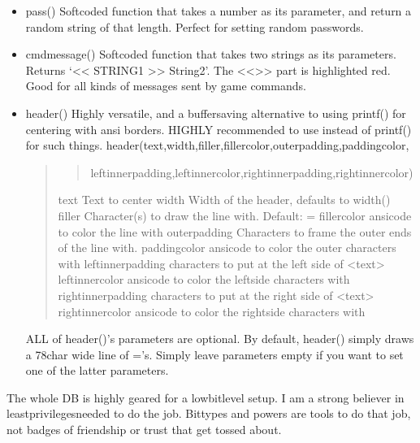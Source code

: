 \documentclass[letterpaper,10pt,english]{sphinxmanual}
\begin{document}
\begin{itemize}
\item {} 
\sphinxAtStartPar
pass() \sphinxhyphen{} Softcoded function that takes a number as its parameter, and return
a random string of that length. Perfect for setting random passwords.

\item {} 
\sphinxAtStartPar
cmdmessage() \sphinxhyphen{} Softcoded function that takes two strings as its parameters.
Returns ‘\textless{}\textless{} STRING1 \textgreater{}\textgreater{} String2’. The \textless{}\textless{}\textgreater{}\textgreater{} part is highlighted red. Good for
all kinds of messages sent by game commands.

\item {} 
\sphinxAtStartPar
header() \sphinxhyphen{} Highly versatile, and a buffer\sphinxhyphen{}saving alternative
to using printf() for centering with ansi borders. HIGHLY recommended to use
instead of printf() for such things.
header(text,width,filler,fillercolor,outerpadding,paddingcolor,
\begin{quote}
\begin{quote}

\sphinxAtStartPar
leftinnerpadding,leftinnercolor,rightinnerpadding,rightinnercolor)
\end{quote}

\sphinxAtStartPar
text \sphinxhyphen{} Text to center
width \sphinxhyphen{} Width of the header, defaults to width()
filler \sphinxhyphen{} Character(s) to draw the line with. Default: =
fillercolor \sphinxhyphen{} ansicode to color the line with
outerpadding \sphinxhyphen{} Characters to frame the outer ends of the line with.
paddingcolor \sphinxhyphen{} ansicode to color the outer characters with
leftinnerpadding \sphinxhyphen{} characters to put at the left side of \textless{}text\textgreater{}
leftinnercolor \sphinxhyphen{} ansicode to color the leftside characters with
rightinnerpadding \sphinxhyphen{} characters to put at the right side of \textless{}text\textgreater{}
rightinnercolor \sphinxhyphen{} ansicode to color the rightside characters with
\end{quote}

\sphinxAtStartPar
ALL of header()’s parameters are optional. By default, header() simply draws
a 78\sphinxhyphen{}char wide line of =’s. Simply leave parameters empty if you want to set
one of the latter parameters.

\end{itemize}

\sphinxAtStartPar
The whole DB is highly geared for a low\sphinxhyphen{}bitlevel setup.
I am a strong believer in least\sphinxhyphen{}privileges\sphinxhyphen{}needed to do the job. Bittypes and
powers are tools to do that job, not badges of friendship or trust that get
tossed about.
\end{document}
